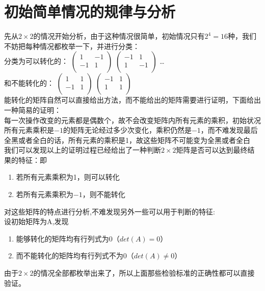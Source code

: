 \documentclass[UTF-8,a4paper]{ctexart}
\begin{document}
\part{初始简单情况的规律与分析}
\songti 先从\(2 \times 2\)的情况开始分析，由于这种情况很简单，初始情况只有\(2^4=16\)种，我们不妨把每种情况都枚举一下，并进行分类：\\
\kaishu
分类为可以转化的：
\(\begin{pmatrix}
    1&-1\\
    -1&1\\
\end{pmatrix}\)
\quad
\(\begin{pmatrix}
    -1&1\\
    1&-1\\
\end{pmatrix}\)
\quad
\dots
\\和不能转化的：
\(\begin{pmatrix}
    1&1\\
    -1&1\\
\end{pmatrix}\)
\quad
\(\begin{pmatrix}
    -1&1\\
    1&1\\
\end{pmatrix}\)
\quad
\songti
\\能转化的矩阵自然可以直接给出方法，而不能给出的矩阵需要进行证明，下面给出一种简易的证明：
\kaishu
\\每一次操作改变的元素都是偶数个，故不会改变矩阵内所有元素的乘积，初始状况所有元素乘积是\(-1\)的矩阵无论经过多少次变化，乘积仍然是\(-1\)，而不难发现最后全黑或者全白的话，所有元素的乘积是1，故这些矩阵不可能变为全黑或者全白
\songti
\\我们可以发现以上的证明过程已经给出了一种判断\(2 \times 2\)矩阵是否可以达到最终结果的特征：即
\kaishu
\begin{enumerate}
    \item 若所有元素乘积为1，则可以转化
    \item 若所有元素乘积为\(-1\)，则不能转化
\end{enumerate}
\songti
对这些矩阵的特点进行分析,不难发现另外一些可以用于判断的特征:
\kaishu
\\设初始矩阵为A,发现
\begin{enumerate}
    \item 能够转化的矩阵均有行列式为0（\(det(A)=0\)）
    \item 而不能转化的矩阵均有行列式不为0（\(det(A)\neq 0\)）
\end{enumerate}
\songti
由于\(2 \times 2\)的情况全部都枚举出来了，所以上面那些检验标准的正确性都可以直接验证。
\end{document}
